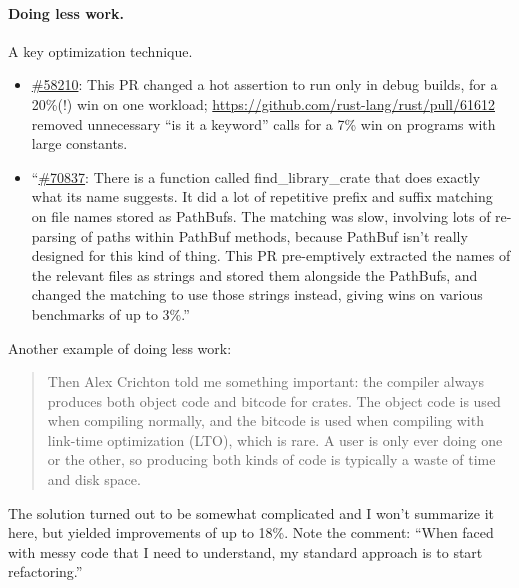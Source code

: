 \paragraph{Doing less work.} A key optimization technique.
\begin{itemize}[noitemsep]
\item {} \href{https://github.com/rust-lang/rust/pull/58210}{\#58210}: This PR changed a hot assertion to run only in debug builds, for a 20\%(!) win on one workload; \url{https://github.com/rust-lang/rust/pull/61612} removed unnecessary ``is it a keyword'' calls for a 7\% win on programs with large constants.
\item {} ``\href{https://github.com/rust-lang/rust/pull/70837}{\#70837}: There is a function called find\_library\_crate that does exactly what its name suggests. It did a lot of repetitive prefix and suffix matching on file names stored as PathBufs. The matching was slow, involving lots of re-parsing of paths within PathBuf methods, because PathBuf isn’t really designed for this kind of thing. This PR pre-emptively extracted the names of the relevant files as strings and stored them alongside the PathBufs, and changed the matching to use those strings instead, giving wins on various benchmarks of up to 3\%.''
\end{itemize}

Another example of doing less work:
\begin{quote}
Then Alex Crichton told me something important: the compiler always produces both object code and bitcode for crates. The object code is used when compiling normally, and the bitcode is used when compiling with link-time optimization (LTO), which is rare. A user is only ever doing one or the other, so producing both kinds of code is typically a waste of time and disk space.
\end{quote}
The solution turned out to be somewhat complicated and I won't summarize it here, but yielded improvements of up to 18\%. Note the comment: ``When faced with messy code that I need to understand, my standard approach is to start refactoring.''

